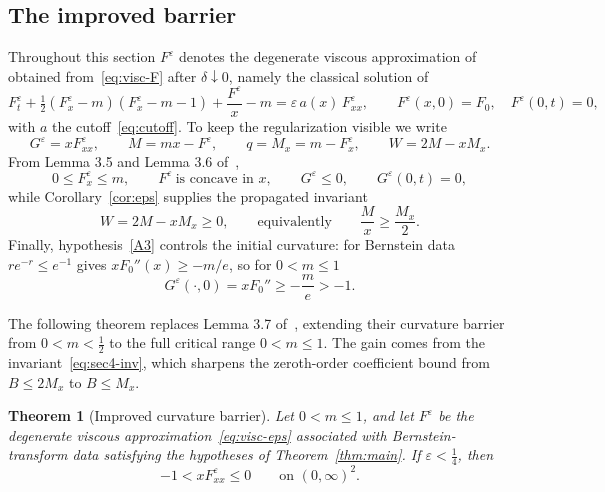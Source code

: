 \documentclass[12pt]{amsart}
\numberwithin{equation}{section}
\theoremstyle{plain}
\newtheorem{theorem}{Theorem}[section]
\theoremstyle{definition}
\newcommand{\eps}{\varepsilon}
\begin{document}
\subsection{The improved barrier}
Throughout this section $F^\eps$ denotes the degenerate viscous approximation
of~\cite{TV} obtained from~\eqref{eq:visc-F} after $\delta\downarrow0$, namely
the classical solution of
\begin{equation}\label{eq:visc-eps}
	F^\eps_t+\tfrac12(F^\eps_x-m)(F^\eps_x-m-1)+\frac{F^\eps}{x}-m
	=\eps\,a(x)\,F^\eps_{xx},
	\qquad F^\eps(x,0)=F_0,\quad F^\eps(0,t)=0,
\end{equation}
with $a$ the cutoff~\eqref{eq:cutoff}. To keep the regularization visible we
write
\[
	G^\eps=xF^\eps_{xx},\qquad M=mx-F^\eps,\qquad q=M_x=m-F^\eps_x,\qquad
	W=2M-xM_x .
\]
From Lemma 3.5 and Lemma 3.6 of~\cite{TV},
\begin{equation}\label{eq:sec4-recall}
	0\le F^\eps_x\le m,\qquad F^\eps\ \text{is concave in }x,\qquad
	G^\eps\le0,\qquad G^\eps(0,t)=0,
\end{equation}
while Corollary~\ref{cor:eps} supplies the propagated invariant
\begin{equation}\label{eq:sec4-inv}
	W=2M-xM_x\ge0,\qquad\text{equivalently}\qquad \frac{M}{x}\ge\frac{M_x}{2}.
\end{equation}
Finally, hypothesis~\ref{A3} controls the initial curvature: for Bernstein data
$re^{-r}\le e^{-1}$ gives $xF_0''(x)\ge-m/e$, so for $0<m\le1$
\begin{equation}\label{eq:initcurv}
	G^\eps(\cdot,0)=xF_0''\ge-\frac{m}{e}>-1 .
\end{equation}

The following theorem replaces Lemma 3.7 of~\cite{TV}, extending their curvature
barrier from $0<m<\tfrac12$ to the full critical range $0<m\le1$.
The gain comes from the invariant~\eqref{eq:sec4-inv}, which sharpens
the zeroth-order
coefficient bound from $B\le2M_x$ to $B\le M_x$.

\begin{theorem}[Improved curvature barrier]\label{thm:barrier}
	Let $0<m\le1$, and let $F^\eps$ be the degenerate viscous
	approximation~\eqref{eq:visc-eps} associated with Bernstein-transform data
	satisfying the hypotheses of Theorem~\ref{thm:main}. If $\eps<\tfrac14$, then
	\[
		-1< xF^\eps_{xx}\le0\qquad\text{on }(0,\infty)^2 .
	\]
\end{theorem}
\end{document}
